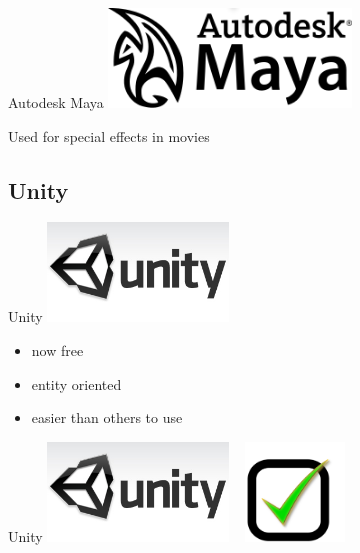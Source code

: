 \documentclass[a4paper,10pt]{beamer}
\begin{document}
			\begin{frame}{Autodesk Maya}
				\includegraphics[height=75pt]{images/logos/Autodesk_Maya.png}
				
				Used for special effects in movies
			\end{frame}
			
		\subsection{Unity}
		
			\begin{frame}{Unity}
				\includegraphics[height=75pt]{images/logos/Logo_Unity.jpg}
				\begin{itemize}
					\item now free
					\item entity oriented
					\item easier than others to use
				\end{itemize}
			\end{frame}
			
			\begin{frame}{Unity}
				\includegraphics[height=75pt]{images/logos/Logo_Unity.jpg}
				\mbox{ }
				\includegraphics[height=75pt]{images/validated.png}
			\end{frame}
		
\end{document}
